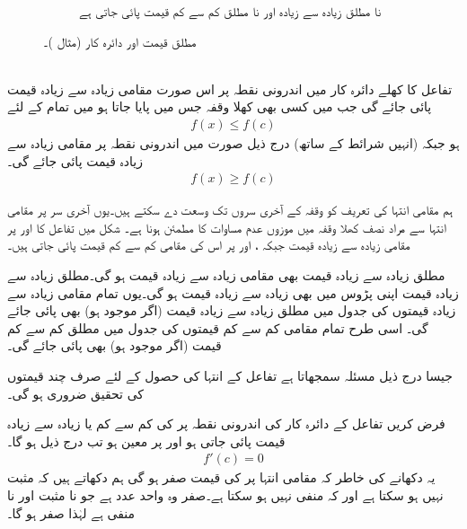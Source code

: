 \begin{figure}
\begin{subfigure}{0.5\textwidth}
\caption{نا مطلق زیادہ سے زیادہ اور نا مطلق کم سے کم قیمت پائی جاتی ہے}
\end{subfigure}
\caption{مطلق قیمت اور دائرہ کار (مثال )۔}
\label{شکل_مثال_استعمال_مطلق_قیمت_دائرہ_کار}
\end{figure}

\\
تفاعل  کا کھلے دائرہ کار  میں اندرونی نقطہ  پر اس صورت مقامی زیادہ سے زیادہ قیمت پائی جائے گی جب  میں کسی بھی کھلا وقفہ جس میں  پایا جاتا ہو میں تمام  کے لئے
\begin{align*}
f(x)\le f(c)
\end{align*}
ہو جبکہ (انہیں شرائط کے ساتھ) درج ذیل صورت میں  اندرونی نقطہ  پر مقامی زیادہ سے زیادہ قیمت پائی جائے گی۔
\begin{align*}
f(x)\ge f(c)
\end{align*} 

ہم مقامی انتہا کی تعریف کو وقفہ کے آخری سروں تک وسعت دے سکتے ہیں۔یوں آخری سر  پر مقامی انتہا سے مراد نصف کھلا وقفہ میں موزوں عدم مساوات کا مطمئن ہونا ہے۔ شکل  میں تفاعل  کا  اور  پر مقامی زیادہ سے زیادہ قیمت جبکہ  ،  اور  پر اس کی مقامی کم سے کم قیمت پائی جاتی ہیں۔

مطلق زیادہ سے زیادہ قیمت بھی مقامی زیادہ سے زیادہ قیمت ہو گی۔مطلق زیادہ سے زیادہ قیمت اپنی پڑوس میں بھی زیادہ سے زیادہ قیمت ہو گی۔یوں تمام مقامی زیادہ سے زیادہ قیمتوں کی جدول میں مطلق زیادہ سے زیادہ قیمت (اگر موجود ہو) بھی پائی جائے گی۔ اسی طرح تمام مقامی کم سے کم قیمتوں کی جدول میں مطلق کم سے کم قیمت (اگر موجود ہو) بھی پائی جائے گی۔

جیسا درج ذیل مسئلہ سمجھاتا ہے تفاعل کے  انتہا کی حصول کے لئے صرف چند قیمتوں کی تحقیق ضروری ہو گی۔

فرض کریں  تفاعل  کے دائرہ کار کی اندرونی نقطہ  پر  کی کم سے کم یا زیادہ سے زیادہ قیمت پائی جاتی ہو اور  پر  معین ہو تب درج ذیل ہو گا۔
\begin{align*}
f'(c)=0
\end{align*} 
یہ دکھانے کی خاطر کہ مقامی انتہا پر  کی قیمت صفر ہو گی ہم  دکھاتے ہیں کہ  مثبت نہیں ہو سکتا ہے اور  کہ  منفی نہیں ہو سکتا ہے۔صفر وہ  واحد عدد ہے جو نا مثبت اور نا منفی ہے لہٰذا  صفر ہو گا۔   

